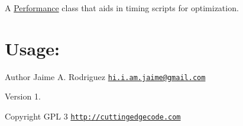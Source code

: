 A \hyperlink{class_performance}{Performance} class that aids in timing scripts for optimization.\hypertarget{robo1_usage}{}\section{Usage\-:}\label{robo1_usage}



\begin{DoxyAuthor}{Author}
Jaime A. Rodriguez \href{mailto:hi.i.am.jaime@gmail.com}{\tt hi.\-i.\-am.\-jaime@gmail.\-com} 
\end{DoxyAuthor}
\begin{DoxyVersion}{Version}
1. 
\end{DoxyVersion}
\begin{DoxyCopyright}{Copyright}
G\-P\-L 3 \href{http://cuttingedgecode.com}{\tt http\-://cuttingedgecode.\-com} 
\end{DoxyCopyright}
